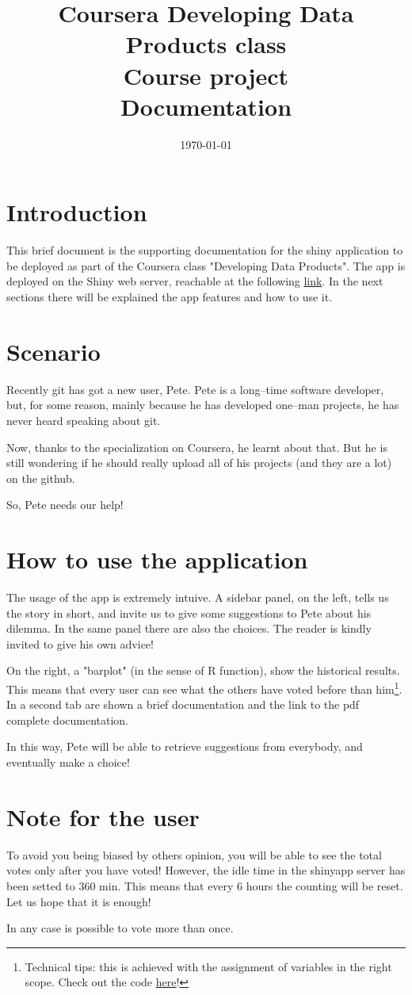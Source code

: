 \documentclass[a4paper,12pt]{article}
\title{Coursera Developing Data Products class\\ Course project\\Documentation}
\author{}
\date{\today}
\begin{document}
\maketitle

\section*{Introduction}
This brief document is the supporting documentation for the shiny application to be deployed as part of the Coursera class "Developing Data Products". The app is deployed on the Shiny web server, reachable at the following \href{https://pgrandinetti.shinyapps.io/shinyApp}{link}. In the next sections there will be explained the app features and how to use it.

\section*{Scenario}
Recently git has got a new user, Pete. Pete is a long--time software developer, but, for some reason, mainly because he has developed one--man projects, he has never heard speaking about git.

Now, thanks to the specialization on Coursera, he learnt about that. But he is still wondering if he should really upload all of his projects (and they are a lot) on the github.

So, Pete needs our help!

\section*{How to use the application}
The usage of the app is extremely intuive. A sidebar panel, on the left, tells us the story in short, and invite us to give some suggestions to Pete about his dilemma. In the same panel there are also the choices. The reader is kindly invited to give his own advice!

On the right, a "barplot" (in the sense of R function), show the historical results. This means that every user can see what the others have voted before than him\footnote{Technical tips: this is achieved with the assignment of variables in the right scope. Check out the code \href{https://github.com/pgrandinetti/dataproductclass}{here}!}. In a second tab are shown a brief documentation and the link to the pdf complete documentation.

In this way, Pete will be able to retrieve suggestions from everybody, and eventually make a choice!

\section*{Note for the user}
To avoid you being biased by others opinion, you will be able to see the total votes only after you have voted! However, the idle time in the shinyapp server has been setted to 360 min. This means that every 6 hours the counting will be reset. Let us hope that it is enough!

In any case is possible to vote more than once.
\end{document}
